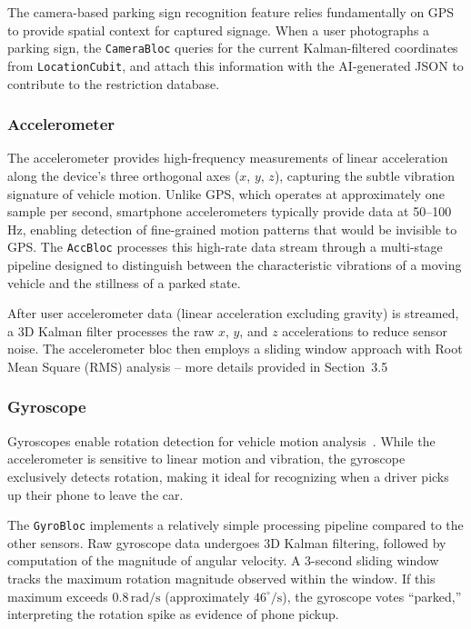 The camera-based parking sign recognition feature relies fundamentally on GPS to provide spatial context for captured signage. When a user photographs a parking sign, the \texttt{CameraBloc} queries for the current Kalman-filtered coordinates from \texttt{LocationCubit}, and attach this information with the AI-generated JSON to contribute to the restriction database.


\subsubsection{Accelerometer}

The accelerometer provides high-frequency measurements of linear acceleration along the device's three orthogonal axes ($x$, $y$, $z$), capturing the subtle vibration signature of vehicle motion. Unlike GPS, which operates at approximately one sample per second, smartphone accelerometers typically provide data at 50--100\,Hz, enabling detection of fine-grained motion patterns that would be invisible to GPS. The \texttt{AccBloc} processes this high-rate data stream through a multi-stage pipeline designed to distinguish between the characteristic vibrations of a moving vehicle and the stillness of a parked state.

After user accelerometer data (linear acceleration excluding gravity) is streamed, a 3D Kalman filter processes the raw $x$, $y$, and $z$ accelerations to reduce sensor noise. The accelerometer bloc then employs a sliding window approach with Root Mean Square (RMS) analysis -- more details provided in Section~3.5


\subsubsection{Gyroscope}

Gyroscopes enable rotation detection for vehicle motion analysis~\cite{liu2017}. While the accelerometer is sensitive to linear motion and vibration, the gyroscope exclusively detects rotation, making it ideal for recognizing when a driver picks up their phone to leave the car.

The \texttt{GyroBloc} implements a relatively simple processing pipeline compared to the other sensors. Raw gyroscope data undergoes 3D Kalman filtering, followed by computation of the magnitude of angular velocity. A 3-second sliding window tracks the maximum rotation magnitude observed within the window. If this maximum exceeds $0.8\,\mathrm{rad/s}$ (approximately $46^{\circ}/\mathrm{s}$), the gyroscope votes ``parked,'' interpreting the rotation spike as evidence of phone pickup.


